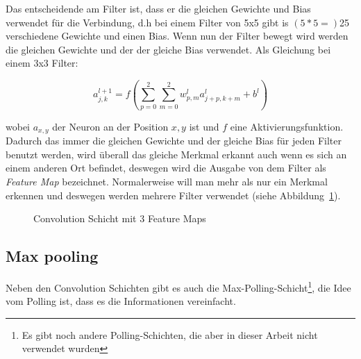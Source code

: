 \documentclass[12pt,a4paper]{report}
\begin{document}
Das entscheidende am Filter ist, dass er die gleichen Gewichte und Bias verwendet für die Verbindung, d.h bei einem
Filter von 5x5 gibt is $(5*5=)$25 verschiedene Gewichte und einen Bias.
Wenn nun der Filter bewegt wird werden die gleichen Gewichte und der der gleiche Bias verwendet.
Als Gleichung bei einem 3x3 Filter:

\[a^{l+1}_{j,k} = f\left(\sum_{p=0}^{2}\sum_{m=0}^{2}w^l_{p,m}a^l_{j+p,k+m} + b^l\right)\]

wobei $a_{x, y}$ der Neuron an der Position $x, y$ ist und $f$ eine Aktivierungsfunktion.
Dadurch das immer die gleichen Gewichte und der gleiche Bias für jeden Filter benutzt werden,
wird überall das gleiche Merkmal erkannt auch wenn es sich an einem anderen Ort befindet,
deswegen wird die Ausgabe von dem Filter als \textit{Feature Map} bezeichnet.
Normalerweise will man mehr als nur ein Merkmal erkennen und deswegen werden mehrere Filter verwendet (siehe Abbildung~\ref{fig:conv4}).

\begin{figure}[h]%
    \centering
{}
    \label{fig:conv4}
    \caption{Convolution Schicht mit 3 Feature Maps}%
\end{figure}

\subsection{Max pooling}
Neben den Convolution Schichten gibt es auch die Max-Polling-Schicht\footnote{Es gibt noch andere Polling-Schichten, die aber in dieser Arbeit nicht verwendet wurden},
die Idee vom Polling ist, dass es die Informationen vereinfacht.
\end{document}

